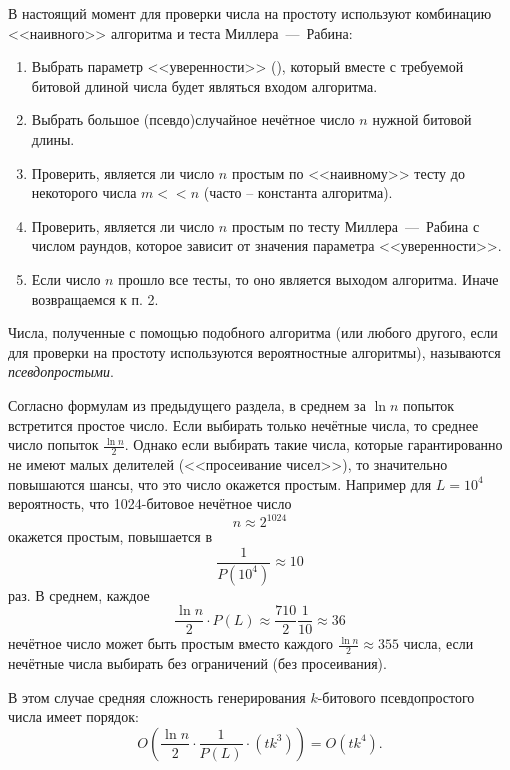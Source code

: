 В настоящий момент для проверки числа на простоту используют комбинацию <<наивного>> алгоритма и теста Миллера~---~Рабина:

\begin{enumerate}
	\item Выбрать параметр <<уверенности>> (), который вместе с требуемой битовой длиной числа будет являться входом алгоритма.
	\item Выбрать большое (псевдо)случайное нечётное число $n$ нужной битовой длины.
	\item Проверить, является ли число $n$ простым по <<наивному>> тесту до некоторого числа $m << n$ (часто -- константа алгоритма).
	\item Проверить, является ли число $n$ простым по тесту Миллера~---~Рабина с числом раундов, которое зависит от значения параметра <<уверенности>>.
	\item Если число $n$ прошло все тесты, то оно является выходом алгоритма. Иначе возвращаемся к п. 2.
\end{enumerate}

Числа, полученные с помощью подобного алгоритма (или любого другого, если для проверки на простоту используются вероятностные алгоритмы), называются \emph{псевдопростыми}.

Согласно формулам из предыдущего раздела, в среднем за $\ln n$ попыток встретится простое число. Если выбирать только нечётные числа, то среднее число попыток $\frac{\ln n}{2}$. Однако если выбирать такие числа, которые гарантированно не имеют малых делителей (<<просеивание чисел>>), то значительно повышаются шансы, что это число окажется простым. Например для $L = 10^4$ вероятность, что 1024-битовое нечётное число
    \[ n \approx 2^{1024} \]
окажется простым, повышается в
    \[ \frac{1}{P(10^4)} \approx 10 \]
раз. В среднем, каждое
    \[ \frac{\ln n}{2} \cdot P(L) \approx \frac{710}{2} \frac{1}{10} \approx 36 \]
нечётное число может быть простым вместо каждого $\frac{\ln n}{2} \approx 355$ числа, если нечётные числа выбирать без ограничений (без просеивания).

В этом случае средняя сложность генерирования $k$-битового псевдопростого числа имеет порядок:
    \[ O \left( \frac{\ln n}{2} \cdot \frac{1}{P(L)} \cdot \left( t k^3 \right) \right) = O(t k^4). \]
